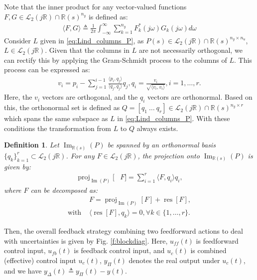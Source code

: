 \documentclass[journal]{IEEEtran}
\newtheorem{definition}{Definition}
\theoremstyle{remark}
\DeclareMathOperator*{\im}{Im}
\DeclareMathOperator*{\proj}{proj}
\DeclareMathOperator*{\res}{res}
\begin{document}
Note that the inner product for any vector-valued functions $F,G \in \mathcal{L}_2(j\mathbb{R}) \cap \mathbb{R}(s)^{n_y}$ is defined as:
\begin{align}
    \langle F,G \rangle \triangleq \frac{1}{2\pi}\int_{-\infty}^\infty \sum_{k=1}^{n_y} F_k^\ast(j\omega)G_k(j\omega)d\omega
\end{align}
Consider \(L\) given in \eqref{eq:Lind_columns_P}, as $ P(s) \in \mathcal{L}_2(j\mathbb{R})\cap \mathbb{R}(s)^{n_y \times n_u}$, $L \in \mathcal{L}_2(j\mathbb{R})$. Given that the columns in \(L\) are not necessarily orthogonal, we can rectify this by applying the Gram-Schmidt process to the columns of \(L\). This process can be expressed as:
\begin{align}
v_i = p_i - \sum_{j=1}^{i-1} \frac{\langle p_i, q_j \rangle}{ \langle q_j,q_j \rangle } q_j,  q_i = \frac{v_i}{\sqrt{\langle v_i,v_i \rangle}},   i = 1, \ldots, r.
\end{align}
Here, the \(v_i\) vectors are orthogonal, and the \(q_i\) vectors are orthonormal. 
Based on this, the orthonormal set is defined as ${Q} = [ q_{1} \ \dots \ q_{r} ]\in \mathcal{L}_2(j\mathbb{R}) \cap \mathbb{R}(s)^{n_y \times r}$ which spans the same subspace as \(L\) in \eqref{eq:Lind_columns_P}. With these conditions the transformation from \(L\) to \(Q\) always exists. 
\begin{definition} \label{def:projres}
Let \(\im_{\mathbb{R}(s)}(P)\) be spanned by an orthonormal basis $\{q_k\}_{k=1}^{r} \subset \mathcal{L}_2(j\mathbb{R})$. For any $F \in \mathcal{L}_2(j\mathbb{R})$, the projection onto $\im_{\mathbb{R}(s)}(P)$ is given by:
\begin{align} 
\label{eq:Profoveractout}
    \proj_{\im{(P)}}[ &F ] = \sum_{i=1}^r \langle F,q_i\rangle q_i,  
\end{align}
where \( F \) can be decomposed as:
\begin{align} \label{eq:projdecomp}
&F = \proj_{\im(P)}[F] + \res[F],\\
\text{with }&\langle \res[F], q_k \rangle = 0,  \forall k \in \{1, \dots, r\}. \label{eq:projdecomp2}
\end{align}
\end{definition}
Then, the overall feedback strategy combining two feedforward actions to deal with uncertainties is given by Fig. \ref{f:blockdiag}. Here, $u_{ff}(t)$ is feedforward control input, $u_{fb}(t)$ is feedback control input, and $u_c(t)$ is combined (effective) control input $u_c(t)$, $y_\Pi(t)$ denotes the real output under $u_c(t)$, and we have $y_\Delta(t) \triangleq y_\Pi(t)-y(t)$.
\end{document}
